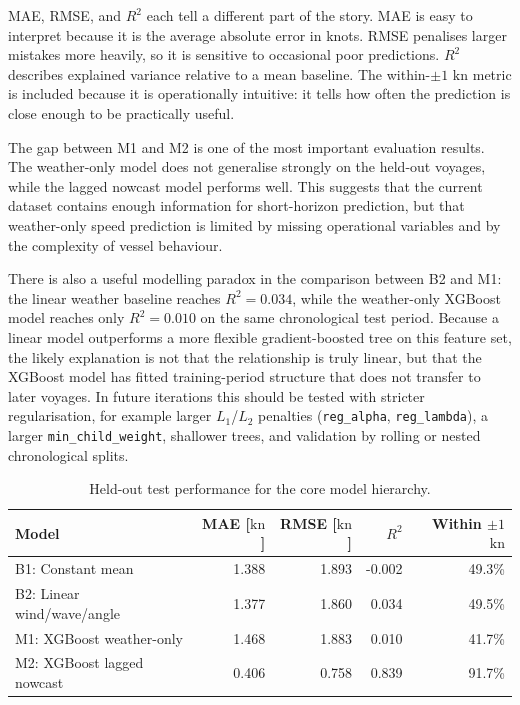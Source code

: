 \documentclass[10pt,a4paper]{article}
\newcommand{\kn}{\ensuremath{\mathrm{kn}}}
\begin{document}
MAE, RMSE, and $R^2$ each tell a different part of the story. MAE is easy to
interpret because it is the average absolute error in knots. RMSE penalises
larger mistakes more heavily, so it is sensitive to occasional poor predictions.
$R^2$ describes explained variance relative to a mean baseline. The
within-$\pm 1$ \kn{} metric is included because it is operationally intuitive:
it tells how often the prediction is close enough to be practically useful.

The gap between M1 and M2 is one of the most important evaluation results. The
weather-only model does not generalise strongly on the held-out voyages, while
the lagged nowcast model performs well. This suggests that the current dataset
contains enough information for short-horizon prediction, but that weather-only
speed prediction is limited by missing operational variables and by the
complexity of vessel behaviour.

There is also a useful modelling paradox in the comparison between B2 and M1:
the linear weather baseline reaches $R^2=0.034$, while the weather-only XGBoost
model reaches only $R^2=0.010$ on the same chronological test period. Because a
linear model outperforms a more flexible gradient-boosted tree on this feature
set, the likely explanation is not that the relationship is truly linear, but
that the XGBoost model has fitted training-period structure that does not
transfer to later voyages. In future iterations this should be tested with
stricter regularisation, for example larger $L_1$/$L_2$ penalties
(\texttt{reg\_alpha}, \texttt{reg\_lambda}), a larger
\texttt{min\_child\_weight}, shallower trees, and validation by rolling or
nested chronological splits.

\begin{table}[H]
\centering
\caption{Held-out test performance for the core model hierarchy.}
\label{tab:model-metrics}
\begin{tabular}{lrrrr}
\toprule
\textbf{Model} & \textbf{MAE [\kn]} & \textbf{RMSE [\kn]} & \textbf{$R^2$} & \textbf{Within $\pm 1$ \kn} \\
\midrule
B1: Constant mean & 1.388 & 1.893 & -0.002 & 49.3\% \\
B2: Linear wind/wave/angle & 1.377 & 1.860 & 0.034 & 49.5\% \\
M1: XGBoost weather-only & 1.468 & 1.883 & 0.010 & 41.7\% \\
M2: XGBoost lagged nowcast & 0.406 & 0.758 & 0.839 & 91.7\% \\
\bottomrule
\end{tabular}
\end{table}
\end{document}
